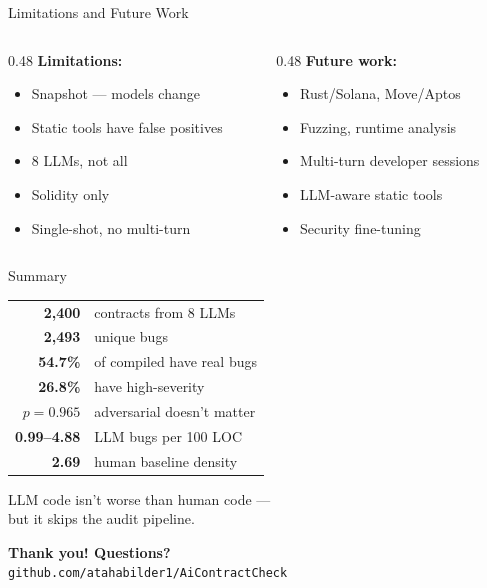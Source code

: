 \documentclass[aspectratio=169]{beamer}
\begin{document}
\begin{frame}{Limitations and Future Work}
\begin{columns}
\begin{column}{0.48\textwidth}
\textbf{Limitations:}
\begin{itemize}\small
    \item Snapshot --- models change
    \item Static tools have false positives
    \item 8 LLMs, not all
    \item Solidity only
    \item Single-shot, no multi-turn
\end{itemize}
\end{column}
\begin{column}{0.48\textwidth}
\textbf{Future work:}
\begin{itemize}\small
    \item Rust/Solana, Move/Aptos
    \item Fuzzing, runtime analysis
    \item Multi-turn developer sessions
    \item LLM-aware static tools
    \item Security fine-tuning
\end{itemize}
\end{column}
\end{columns}
\end{frame}

\begin{frame}{Summary}
\begin{center}
\small
\begin{tabular}{@{}rl@{}}
\textbf{2,400} & contracts from 8 LLMs \\
\textbf{2,493} & unique bugs \\
\textbf{54.7\%} & of compiled have real bugs \\
\textbf{26.8\%} & have high-severity \\
\textbf{$p = 0.965$} & adversarial doesn't matter \\
\textbf{0.99--4.88} & LLM bugs per 100 LOC \\
\textbf{2.69} & human baseline density \\
\end{tabular}
\end{center}

\vspace{0.15cm}
\begin{block}{}
\centering
LLM code isn't worse than human code --- \\
but it skips the audit pipeline.
\end{block}

\vspace{0.2cm}
\begin{center}
{\large\bfseries Thank you! \quad Questions?}\\[0.2cm]
\small\texttt{github.com/atahabilder1/AiContractCheck}
\end{center}
\end{frame}
\end{document}
